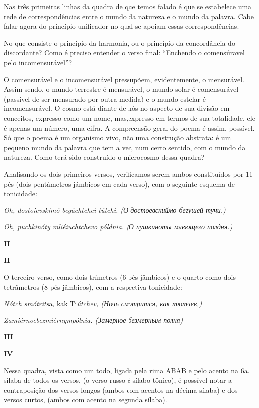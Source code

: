 Nas três primeiras linhas da quadra de que temos falado é que se
estabelece uma rede de correspondências entre o mundo da natureza e o
mundo da palavra. Cabe falar agora do princípio unificador no qual se
apoiam essas correspondências.

No que consiste o princípio da harmonia, ou o princípio da concordância
do discordante? Como é preciso entender o verso final: ``Enchendo o
comensúravel pelo incomensurável''?

O comensurável e o incomensurável pressupõem, evidentemente, o
mensurável. Assim sendo, o mundo terrestre é mensurável, o mundo solar é
comensurável (passível de ser mensurado por outra medida) e o mundo
estelar é incomensurável. O cosmo está diante de nós no aspecto de sua
divisão em conceitos, expresso como um nome, mas,expresso em termos de
sua totalidade, ele é apenas um número, uma cifra. A compreensão geral
do poema é assim, possível. Só que o poema é um organismo vivo, não uma
construção abstrata: é um pequeno mundo da palavra que tem a ver, num
certo sentido, com o mundo da natureza. Como terá sido construído o
microcosmo dessa quadra?

Analisando os dois primeiros versos, verificamos serem ambos
constituídos por 11 pés (dois pentâmetros jámbicos em cada verso), com o
seguinte esquema de tonicidade:

\emph{Oh, dostoievskimó begúchtchei tútchi. (О достоевскиймо бегушей
тучи.)}

\emph{Oh, puchkinóty mliéiuchtchevo póldnia. (О пушкиноты млеющего
полдня.)}

\textbf{II }

\textbf{II~}

O terceiro verso, como dois trímetros (6 pés jâmbicos) e o quarto como
dois tetrâmetros (8 pés jâmbicos), com a respectiva tonicidade:

\emph{Nótch smótrits}a, kak Ti\emph{útchev, (Ночь смотрится, как
тютчев,)}

\emph{Zamiérnoebezmiérnympólnia. (Замерное безмерным полня)}

\textbf{III }

\textbf{IV\\
}

Nessa quadra, vista como um todo, ligada pela rima ABAB e pelo acento na
6a. sílaba de todos os versos, (o verso russo é sílabo-tônico), é
possível notar a contraposição dos versos longos (ambos com acentos na
décima sílaba) e dos versos curtos, (ambos com acento na segunda
sílaba).

